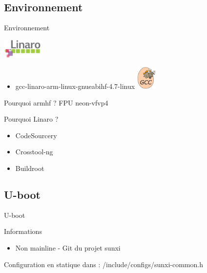 \documentclass[11pt]{beamer}
\begin{document}
	\subsection{Environnement}
	\begin{frame}{Environnement}
	\begin{center}
	  \includegraphics[width=2cm]{commons/linaro.jpeg}
	\end{center}
	\begin{itemize}
			\item gcc-linaro-arm-linux-gnueabihf-4.7-linux
			\includegraphics[width=1cm]{commons/gnu.jpeg}
	\end{itemize}
	\begin{block}{Pourquoi armhf ?}
		FPU neon-vfvp4
	\end{block}
	\begin{block}{Pourquoi Linaro ?}
	\begin{itemize}
	      \item CodeSourcery
	      \item Crosstool-ng
	      \item Buildroot
	\end{itemize}
	\end{block}
	\end{frame}
	
	\subsection{U-boot}
	\begin{frame}{U-boot}
		\begin{block}{Informations}
		\begin{itemize}
			\item Non mainline - Git du projet sunxi
			\href{https://github.com/linux-sunxi/u-boot-sunxi}{}
		\end{itemize}
	\end{block}
	Configuration en statique dans : /include/configs/sunxi-common.h
	\end{frame}
	
\end{document}
